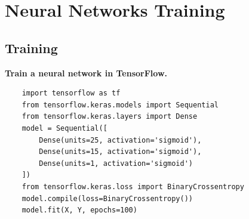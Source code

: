 \chapter{Neural Networks Training}
\section{Training}
\textbf{Train a neural network in TensorFlow.}
\begin{verbatim}
    import tensorflow as tf
    from tensorflow.keras.models import Sequential
    from tensorflow.keras.layers import Dense
    model = Sequential([
        Dense(units=25, activation='sigmoid'),
        Dense(units=15, activation='sigmoid'),
        Dense(units=1, activation='sigmoid')
    ])
    from tensorflow.keras.loss import BinaryCrossentropy
    model.compile(loss=BinaryCrossentropy())
    model.fit(X, Y, epochs=100)
\end{verbatim}

